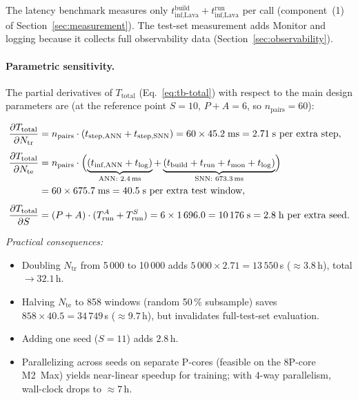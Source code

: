 \documentclass[11pt,a4paper]{article}
\begin{document}
\noindent The latency benchmark measures only
$t_{\text{inf,Lava}}^{\text{build}} + t_{\text{inf,Lava}}^{\text{run}}$
per call (component~(1) of Section~\ref{sec:measurement}).
The test-set measurement adds Monitor and logging because it collects
full observability data (Section~\ref{sec:observability}).

\paragraph{Parametric sensitivity.}
The partial derivatives of $T_{\text{total}}$
(Eq.~\ref{eq:tb-total}) with respect to the main
design parameters are (at the reference point
$S = 10$, $P + A = 6$, so $n_{\text{pairs}} = 60$):

\begin{align}
  \frac{\partial T_{\text{total}}}{\partial N_{\text{tr}}}
    &= n_{\text{pairs}} \cdot
       (t_{\text{step,ANN}} + t_{\text{step,SNN}})
     = 60 \times 45.2\;\text{ms}
     = 2.71\;\text{s per extra step}, \label{eq:sens-train} \\[4pt]
  \frac{\partial T_{\text{total}}}{\partial N_{\text{te}}}
    &= n_{\text{pairs}} \cdot
       \Bigl(
         \underbrace{(t_{\text{inf,ANN}} + t_{\text{log}})}_{\text{ANN: 2.4\,ms}}
       + \underbrace{(t_{\text{build}} + t_{\text{run}}
           + t_{\text{mon}} + t_{\text{log}})}_{\text{SNN: 673.3\,ms}}
       \Bigr) \notag \\
    &= 60 \times 675.7\;\text{ms}
     = 40.5\;\text{s per extra test window}, \label{eq:sens-test} \\[4pt]
  \frac{\partial T_{\text{total}}}{\partial S}
    &= (P + A) \cdot
       (T_{\text{run}}^{A} + T_{\text{run}}^{S})
     = 6 \times 1\,696.0
     = 10\,176\;\text{s} = 2.8\;\text{h per extra seed}.
     \label{eq:sens-seed}
\end{align}

\noindent\emph{Practical consequences:}
\begin{itemize}[nosep]
\item Doubling $N_{\text{tr}}$ from 5\,000 to 10\,000 adds
  $5\,000 \times 2.71 = 13\,550$\,s ($\approx 3.8$\,h),
  total $\rightarrow 32.1$\,h.
\item Halving $N_{\text{te}}$ to 858 windows (random 50\,\% subsample)
  saves $858 \times 40.5 = 34\,749$\,s ($\approx 9.7$\,h),
  but invalidates full-test-set evaluation.
\item Adding one seed ($S = 11$) adds $2.8$\,h.
\item Parallelizing across seeds on separate P-cores (feasible on the
  8P-core M2~Max) yields near-linear speedup for training;
  with 4-way parallelism, wall-clock drops to $\approx 7$\,h.
\end{itemize}
\end{document}
